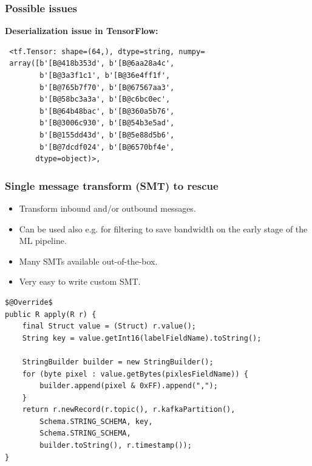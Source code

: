 \documentclass[10pt,utf8]{beamer}
\begin{document}
\begin{frame}[fragile]
    \frametitle{Possible issues}
    \textbf{Deserialization issue in TensorFlow:}
    \vspace{0.5cm}
   \begin{lstlisting}
 <tf.Tensor: shape=(64,), dtype=string, numpy=
 array([b'[B@418b353d', b'[B@6aa28a4c',
        b'[B@3a3f1c1', b'[B@36e4ff1f',
        b'[B@765b7f70', b'[B@67567aa3',
        b'[B@58bc3a3a', b'[B@c6bc0ec',
        b'[B@64b48bac', b'[B@360a5b76',
        b'[B@3006c930', b'[B@54b3e5ad',
        b'[B@155dd43d', b'[B@5e88d5b6',
        b'[B@7dcdf024', b'[B@6570bf4e',
       dtype=object)>,
   \end{lstlisting}
\end{frame}

\begin{frame}[fragile]
    \frametitle{Single message transform (SMT) to rescue}
    \begin{itemize}
      \item Transform inbound and/or outbound messages.
      \item Can be used also e.g. for filtering to save bandwidth on the early stage of the ML pipeline.
      \item Many SMTs available out-of-the-box.
      \item Very easy to write custom SMT.
    \end{itemize}

    \vspace{0.5cm}
    
    \begin{lstlisting}[style=java]
$@Override$
public R apply(R r) {
    final Struct value = (Struct) r.value();
    String key = value.getInt16(labelFieldName).toString();

    StringBuilder builder = new StringBuilder();
    for (byte pixel : value.getBytes(pixlesFieldName)) {
        builder.append(pixel & 0xFF).append(",");
    }
    return r.newRecord(r.topic(), r.kafkaPartition(),
        Schema.STRING_SCHEMA, key,
        Schema.STRING_SCHEMA,
        builder.toString(), r.timestamp());
} 
     \end{lstlisting}
\end{frame}
\end{document}
